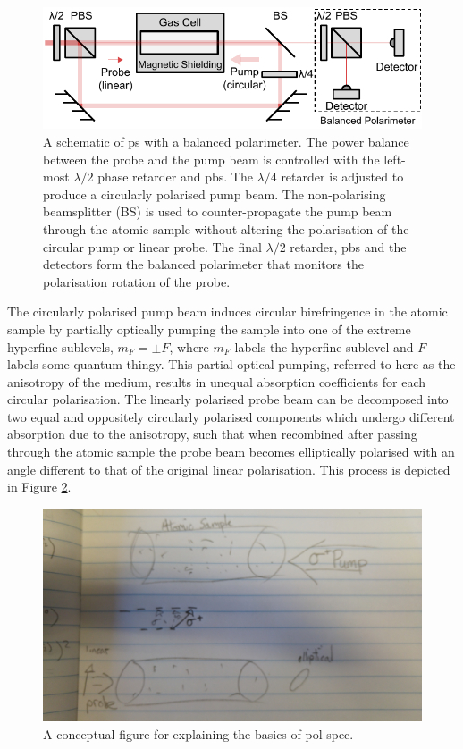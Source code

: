 \begin{figure}
\centering
\includegraphics[width=\linewidth]{part1/Figs/PolSpecSchematic.pdf}
\caption{A schematic of \gls{ps} with a balanced polarimeter.
The power balance between the probe and the pump beam is controlled with the left-most $\lambda/2$ phase retarder and \gls{pbs}.
The $\lambda/4$ retarder is adjusted to produce a circularly polarised pump beam.
The non-polarising beamsplitter (BS) is used to counter-propagate the pump beam through the atomic sample without altering the polarisation of the circular pump or linear probe.
The final $\lambda/2$ retarder, \gls{pbs} and the detectors form the balanced polarimeter that monitors the polarisation rotation of the probe.}
\label{figure:pol_spec_schematic}
\end{figure}

The circularly polarised pump beam induces circular birefringence in the atomic sample by partially optically pumping the sample into one of the extreme hyperfine sublevels, $m_F=\pm F$, where $m_F$ labels the hyperfine sublevel and $F$ labels {\color{red}some quantum thingy.}
This partial optical pumping, referred to here as the anisotropy of the medium, results in unequal absorption coefficients for each circular polarisation.
The linearly polarised probe beam can be decomposed into two equal and oppositely circularly polarised components which undergo different absorption due to the anisotropy, such that when recombined after passing through the atomic sample the probe beam becomes elliptically polarised with an angle different to that of the original linear polarisation.
This process is depicted in Figure \ref{figure:pol_spec_explanation}.

\begin{figure}
\centering
\includegraphics[width=\linewidth,angle=180]{part1/Figs/pol_spec_explanation_placeholder.jpg}
\caption{A conceptual figure for explaining the basics of pol spec.}
\label{figure:pol_spec_explanation}
\end{figure}


